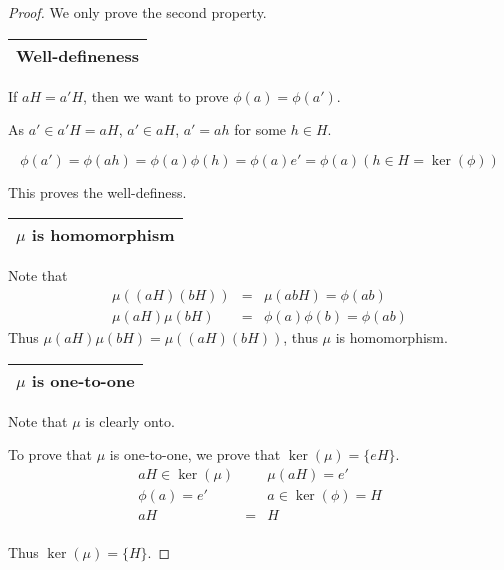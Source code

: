 \documentclass{article}
\theoremstyle{MyNonumberplain}
\theoremstyle{break}
\newtheorem*{proof}{Proof. }
\newcommand{\p}{\phi}
\theoremstyle{break}
\theoremstyle{break}
\theoremstyle{definition}
\theoremstyle{break}
\begin{document}
\begin{thmbox}
    \begin{prfbox}
        \begin{proof}
            We only prove the second property.\bigskip

            \begin{tabular}{|c|}
            \hline
            Well-defineness\\
            \hline
            \end{tabular}\bigskip

            If $a H = a' H$, then we want to prove $\p (a) = \p (a')$.\bigskip

            As $a' \in a' H = a H$, $a' \in a H$, $a' = a h$ for some $h \in H$.

            $$\p (a') = \p (a h) = \p (a) \p (h) = \p (a) e' = \p (a) \left( h \in H =
            \ker \left( \p \right) \right)$$

            This proves the well-definess.\bigskip

            \begin{tabular}{|c|}
            \hline
            $\mu$ is homomorphism\\
            \hline
            \end{tabular}\bigskip

            Note that
            \begin{eqnarray*}
            \mu ( (a H) (b H)) & = & \mu (a b H) = \p (a b)\\
            \mu (a H) \mu (b H) & = & \p (a) \p (b) = \p (a b)
            \end{eqnarray*}
            Thus $\mu (a H) \mu (b H) = \mu ( (a H) (b H))$, thus $\mu$ is homomorphism.\bigskip

            \begin{tabular}{|c|}
            \hline
            $\mu$ is one-to-one\\
            \hline
            \end{tabular}\bigskip

            Note that $\mu$ is clearly onto.\bigskip

            To prove that $\mu$ is one-to-one, we prove that $\ker (\mu) = \{ e H \}$.\bigskip
            \begin{eqnarray*}
            a H \in \ker (\mu) &  & \mu (a H) = e'\\
            \p (a) = e' &  & a \in \ker \left( \p \right) = H\\
            a H & = & H
            \end{eqnarray*}\\
            Thus $\ker (\mu) = \{ H \}$.
        \end{proof}
    \end{prfbox}
\end{thmbox}
\end{document}
